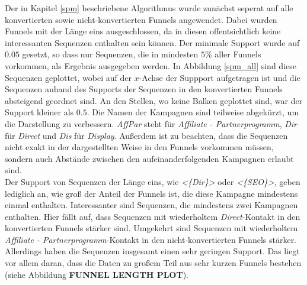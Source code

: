 Der in Kapitel \ref{spm} beschriebene Algorithmus wurde zunächst seperat auf alle konvertierten sowie nicht-konvertierten Funnels angewendet. Dabei wurden Funnels mit der Länge eins ausgeschlossen, da in diesen offentsichtlich keine interessanten Sequenzen enthalten sein können. Der minimale Support wurde auf $0.05$ gesetzt, so dass nur Sequenzen, die in mindesten $5 \%$ aller Funnels vorkommen, als Ergebnis ausgegeben werden. In Abbildung \ref{spm_all} sind diese Sequenzen geplottet, wobei auf der $x$-Achse der Suppport aufgetragen ist und die Sequenzen anhand des Supports der Sequenzen in den konvertierten Funnels absteigend geordnet sind. An den Stellen, wo keine Balken geplottet sind, war der Support kleiner als $0.5$. Die Namen der Kampagnen sind teilweise abgekürzt, um die Darstellung zu verbessern. \textit{AffPar} steht für \textit{Affiliate - Partnerprogramm}, \textit{Dir} für \textit{Direct} und \textit{Dis} für \textit{Display}. Außerdem ist zu beachten, dass die Sequenzen nicht exakt in der dargestellten Weise in den Funnels vorkommen müssen, sondern auch Abstände zwischen den aufeinanderfolgenden Kampagnen erlaubt sind.\\
Der Support von Sequenzen der Länge eins, wie \textit{<\{Dir\}>} oder \textit{<\{SEO\}>}, geben lediglich an, wie groß der Anteil der Funnels ist, die diese Kampagne mindestens einmal enthalten. Interessanter sind Sequenzen, die mindestens zwei Kampagnen enthalten. Hier fällt auf, dass Sequenzen mit wiederholtem \textit{Direct}-Kontakt in den konvertierten Funnels stärker sind. Umgekehrt sind  Sequenzen mit wiederholtem \textit{Affiliate - Partnerprogramm}-Kontakt in den nicht-konvertierten Funnels stärker. Allerdings haben die Sequenzen insgesamt einen sehr geringen Support. Das liegt vor allem daran, dass die Daten zu großem Teil aus sehr kurzen Funnels bestehen (siehe Abbildung \textbf{FUNNEL LENGTH PLOT}).\\
